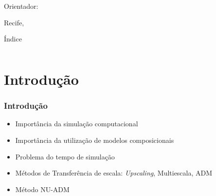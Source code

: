 \documentclass[professionalfont]{beamer}
\begin{document}
\begin{frame}
    \begin{minipage}{\textwidth}
        \begin{tcolorbox}[halign=center,
    valign=center,colupper=black,boxsep=1pt,width=\textwidth,colback={white},colbacktitle=yellow]    
            \Large \titulo
        \end{tcolorbox}
    \end{minipage}
    
    \vspace{0.3cm}
    
    \begin{minipage}{\textwidth}
        \autor
        
        Orientador: \orientador
    \end{minipage}
    
    \vfill
        
    Recife, \dia
    
    
    
    
\end{frame}

\begin{frame}{Índice}
\begin{columns}[t]
        \begin{column}{.4\textwidth}
            \tableofcontents[sections={1-3}]
        \end{column}
        \begin{column}{.4\textwidth}
            \tableofcontents[sections={4-6}]
        \end{column}
    \end{columns}
\end{frame}

\section{Introdução}



\begin{frame}
\frametitle{Introdução}
\begin{itemize}
    \item Importância da simulação computacional
    \item Importância da utilização de modelos composicionais
    \item Problema do tempo de simulação
    \item Métodos de Transferência de escala: \textit{Upscaling}, Multiescala, ADM
    \item Método NU-ADM
\end{itemize}
\end{frame}
\end{document}
